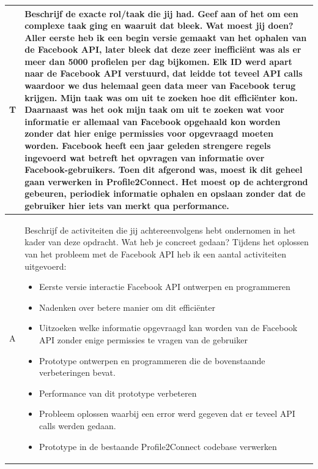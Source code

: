 \begin{tabularx}{\textwidth}{| l | X |}
\\
\hline
T & Beschrijf de exacte rol/taak die jij had. Geef aan of het om een complexe taak ging en waaruit dat bleek. Wat moest jij doen?
\newline
\newline
Aller eerste heb ik een begin versie gemaakt van het ophalen van de Facebook API, later bleek dat deze zeer inefficiënt was als er meer dan 5000 profielen per dag bijkomen. Elk ID werd apart naar de Facebook API verstuurd, dat leidde tot teveel API calls waardoor we dus helemaal geen data meer van Facebook terug krijgen. Mijn taak was om uit te zoeken hoe dit efficiënter kon. Daarnaast was het ook mijn taak om uit te zoeken wat voor informatie er allemaal van Facebook opgehaald kon worden zonder dat hier enige permissies voor opgevraagd moeten worden. Facebook heeft een jaar geleden strengere regels ingevoerd wat betreft het opvragen van informatie over Facebook-gebruikers. Toen dit afgerond was, moest ik dit geheel gaan verwerken in Profile2Connect. Het moest op de achtergrond gebeuren, periodiek informatie ophalen en opslaan zonder dat de gebruiker hier iets van merkt qua performance.
\\
\hline
A & Beschrijf de activiteiten die jij achtereenvolgens hebt ondernomen in het kader van deze opdracht. Wat heb je concreet gedaan?
\newline
\newline
Tijdens het oplossen van het probleem met de Facebook API heb ik een aantal activiteiten uitgevoerd:

\begin{itemize}
\item Eerste versie interactie Facebook API ontwerpen en programmeren
\item Nadenken over betere manier om dit efficiënter
\item Uitzoeken welke informatie opgevraagd kan worden van de Facebook API zonder enige permissies te vragen van de gebruiker
\item Prototype ontwerpen en programmeren die de bovenstaande verbeteringen bevat.
\item Performance van dit prototype verbeteren
\item Probleem oplossen waarbij een error werd gegeven dat er teveel API calls werden gedaan.
\item Prototype in de bestaande Profile2Connect codebase verwerken
\end{itemize}


\end{tabularx}
